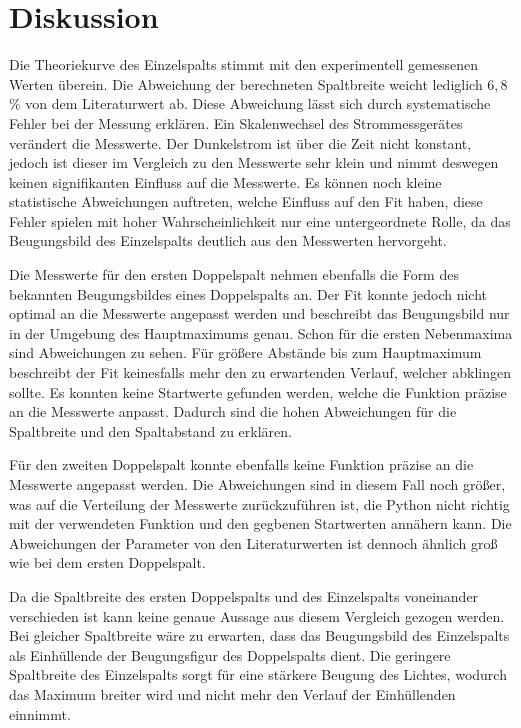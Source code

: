 \section{Diskussion}
\label{sec:Diskussion}

Die Theoriekurve des Einzelspalts stimmt mit den experimentell gemessenen Werten überein. Die Abweichung der berechneten Spaltbreite weicht lediglich
$6,8\,$\% von dem Literaturwert ab. Diese Abweichung lässt sich durch systematische Fehler bei der Messung erklären. Ein Skalenwechsel des
Strommessgerätes verändert die Messwerte. Der Dunkelstrom ist über die Zeit nicht konstant, jedoch ist dieser im Vergleich zu
den Messwerte sehr klein und nimmt deswegen keinen signifikanten Einfluss auf die Messwerte. Es können noch kleine
statistische Abweichungen auftreten, welche Einfluss auf den Fit haben, diese Fehler spielen mit hoher Wahrscheinlichkeit nur eine untergeordnete
Rolle, da das Beugungsbild des Einzelspalts deutlich aus den Messwerten hervorgeht.

Die Messwerte für den ersten Doppelspalt nehmen ebenfalls die Form des bekannten Beugungsbildes eines Doppelspalts an. Der Fit konnte jedoch nicht
optimal an die Messwerte angepasst werden und beschreibt das Beugungsbild nur in der Umgebung des Hauptmaximums genau. Schon für
die ersten Nebenmaxima sind Abweichungen zu sehen. Für größere Abstände bis zum Hauptmaximum beschreibt der Fit keinesfalls mehr den zu erwartenden Verlauf, welcher
abklingen sollte. Es konnten keine Startwerte gefunden werden, welche die Funktion präzise an die Messwerte anpasst.
Dadurch sind die hohen Abweichungen für die Spaltbreite und den Spaltabstand zu erklären.

Für den zweiten Doppelspalt konnte ebenfalls keine Funktion präzise an die Messwerte angepasst werden. Die Abweichungen sind in diesem Fall noch größer,
was auf die Verteilung der Messwerte zurückzuführen ist, die Python nicht richtig mit der verwendeten Funktion und den
gegbenen Startwerten annähern kann.
Die Abweichungen der Parameter von den Literaturwerten ist dennoch ähnlich groß wie bei dem ersten Doppelspalt.


Da die Spaltbreite des ersten Doppelspalts und des Einzelspalts voneinander verschieden ist kann keine genaue Aussage aus diesem Vergleich gezogen werden.
Bei gleicher Spaltbreite wäre zu erwarten, dass das Beugungsbild des Einzelspalts als Einhüllende der Beugungsfigur des Doppelspalts dient.
Die geringere Spaltbreite des Einzelspalts sorgt für eine stärkere Beugung des Lichtes, wodurch das Maximum breiter  wird und nicht mehr den
Verlauf der Einhüllenden einnimmt.

